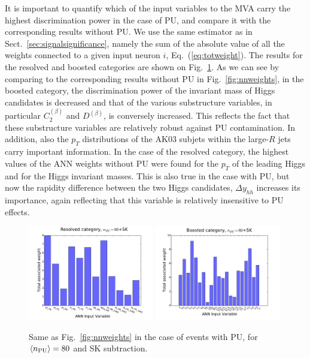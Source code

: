 It is important to quantify which of the input variables
to the MVA carry the highest discrimination power
in the case of PU,
and compare it with the corresponding
results without PU.
%
We use the same estimator as in Sect.~\ref{sec:signalsignificance},
namely the sum
of the absolute value of all the weights connected to a given
input neuron $i$, Eq.~(\ref{eq:totweight}).
%
The results for the resolved and boosted categories are shown
on Fig.~\ref{fig:nnweights_PU}.
%
As we can see by comparing to the corresponding
results without PU in Fig.~\ref{fig:nnweights}, 
in the boosted category, the discrimination power of the invariant
mass of Higgs candidates is decreased and that of the various substructure
variables, in particular $C_2^{(\beta)}$ and
$D^{(\beta)}$, is conversely
increased.
%
This reflects the fact that these substructure variables are
relatively robust against PU contamination.
%
In addition, also the $p_T$ distributions of the AK03
subjets within the large-$R$
jets carry important information.
%
In the case of the resolved category,  the highest
values of the ANN weights without PU
were found for the $p_T$ of the leading
Higgs and for the Higgs invariant masses.
%
This is also true in the case with PU, but now the rapidity difference
between the two Higgs candidates, $\Delta y_{hh}$ increases its
importance, again reflecting that this variable is relatively
insensitive to PU effects.
%

\begin{figure}[t]
\begin{center}
\includegraphics[width=0.49\textwidth]{plots/res_wgthist_SKPU80.pdf}
\includegraphics[width=0.49\textwidth]{plots/bst_wgthist_SKPU80.pdf}
\vspace{-0.5cm}
\caption{\small
Same as Fig.~\ref{fig:nnweights} in the
case of events with PU, for
 $\left\langle n_{\rm PU}\right\rangle=80$ 
  and SK subtraction.
}
\label{fig:nnweights_PU}
\end{center}
\end{figure}

